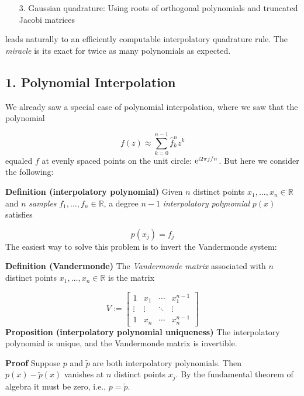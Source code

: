 \documentclass[12pt,a4paper]{article}
\def\bbR{ {\mathbb R} }
\begin{document}
\begin{itemize}
\item[3. ] Gaussian quadrature: Using roots of orthogonal polynomials and truncated Jacobi matrices 

\end{itemize}
leads naturally to an efficiently computable interpolatory quadrature rule. The \emph{miracle} is its exact for twice as many polynomials as expected.

\subsection{1. Polynomial Interpolation}
We already saw a special case of polynomial interpolation, where we saw that the polynomial

\[
f(z) \ensuremath{\approx} \ensuremath{\sum}_{k=0}^{n-1} \hat{f}_k^n z^k
\]
equaled $f$ at evenly spaced points on the unit circle: ${\rm e}^{{\rm i} 2\ensuremath{\pi} j/n}$.  But here we consider the following:

\textbf{Definition (interpolatory polynomial)} Given $n$ distinct points $x_1,\ensuremath{\ldots},x_n \ensuremath{\in} \ensuremath{\bbR}$  and $n$ \emph{samples} $f_1,\ensuremath{\ldots},f_n \ensuremath{\in} \ensuremath{\bbR}$, a degree $n-1$ \emph{interpolatory polynomial} $p(x)$ satisfies

\[
p(x_j) = f_j
\]
The easiest way to solve this problem is to invert the Vandermonde system:

\textbf{Definition (Vandermonde)} The \emph{Vandermonde matrix} associated with $n$ distinct points $x_1,\ensuremath{\ldots},x_n \ensuremath{\in} \ensuremath{\bbR}$ is the matrix

\[
V := \begin{bmatrix} 1 & x_1 & \ensuremath{\cdots} & x_1^{n-1} \\
                    \ensuremath{\vdots} & \ensuremath{\vdots} & \ensuremath{\ddots} & \ensuremath{\vdots} \\
                    1 & x_n & \ensuremath{\cdots} & x_n^{n-1}
                    \end{bmatrix}
\]
\textbf{Proposition (interpolatory polynomial uniqueness)}  The interpolatory polynomial is unique, and the Vandermonde matrix is invertible.

\textbf{Proof} Suppose $p$ and $\tilde{p}$ are both interpolatory polynomials. Then $p(x) - \tilde{p}(x)$ vanishes at $n$ distinct points $x_j$. By the fundamental theorem of algebra it must be zero, i.e., $p = \tilde{p}$.
\end{document}

